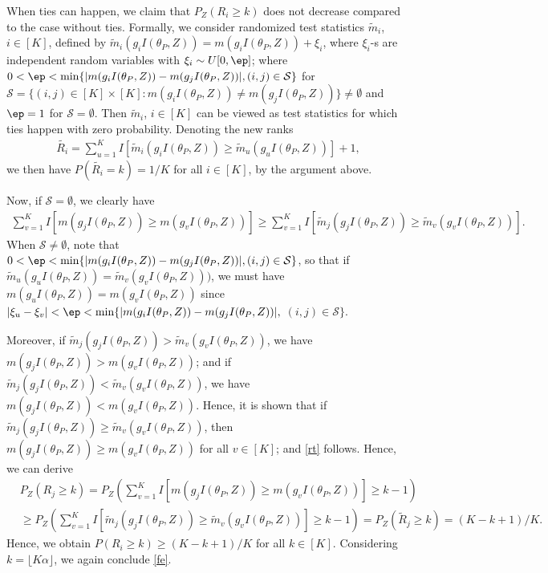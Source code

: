 \documentclass[english]{article}
\begin{document}
When ties can happen, we claim that $P_Z(R_i \ge k)$ does not decrease compared to the case without ties. Formally, we consider randomized test statistics $\tilde{m}_i$, $i\in[K]$, defined by $\tilde{m}_i(g_iI(\theta_P, Z)) = m(g_iI(\theta_P, Z)) + \xi_i$,
where $\xi_i$-s are independent random variables with $\xi_i \sim U[0,\ep]$; where $0 < \ep < \min\{|m(g_iI(\theta_P, Z))-m(g_jI(\theta_P, Z))|, (i,j) \in \mathcal{S}\}$ for $\mathcal{S} = \{(i,j) \in [K] \times [K]:m(g_iI(\theta_P, Z)) \neq m(g_jI(\theta_P, Z))\} \neq \emptyset$ and $\ep=1$ for $\mathcal{S} = \emptyset$. 
Then $\tilde{m}_i$, $i\in[K]$ can be viewed as test statistics for which ties happen with zero probability. 
Denoting the new ranks
 \begin{align*}\tilde{R_i}
    = \sum_{u=1}^K I
[ \tilde{m}_i(g_iI(\theta_P,Z)) \ge \tilde{m}_u(g_uI(\theta_P,Z)) ] + 1,
 \end{align*}
we then have $P(\tilde{R_i} = k) = 1/K$ for all $i \in [K]$, by the argument above. 

Now, if $\mathcal{S} = \emptyset$,
we clearly have
\begin{align}\label{rt}
  \sum_{v=1}^K I
[ m(g_jI(\theta_P,Z)) \ge m(g_vI(\theta_P,Z)) ] \ge  \sum_{v=1}^K I
[ \tilde{m}_j(g_jI(\theta_P,Z)) \ge \tilde{m}_v(g_vI(\theta_P,Z)) ]. 
\end{align}
When $\mathcal{S} \neq \emptyset$,
note that $0 < \ep < \min\{|m(g_iI(\theta_P, Z))-m(g_jI(\theta_P, Z))|, (i,j) \in \mathcal{S}\}$,
so that
if $\tilde{m}_u(g_uI(\theta_P,Z)) =\tilde{m}_v(g_vI(\theta_P,Z)))$, we must have $m(g_uI(\theta_P,Z)) = m(g_vI(\theta_P,Z))$ since $|\xi_u-\xi_v|<\ep < \min\{|m(g_iI(\theta_P, Z))-m(g_jI(\theta_P, Z))|,$ $(i,j) \in \mathcal{S}\}$.

Moreover, if $\tilde{m}_j(g_jI(\theta_P,Z)) > \tilde{m}_v(g_vI(\theta_P,Z))$, we have $m(g_jI(\theta_P,Z)) > m(g_vI(\theta_P,Z))$; and if  $\tilde{m}_j(g_jI(\theta_P,Z)) < \tilde{m}_v(g_vI(\theta_P,Z))$, we have $m(g_jI(\theta_P,Z)) < m(g_vI(\theta_P,Z))$. 
Hence, it is shown that
if $\tilde{m}_j(g_jI(\theta_P,Z)) \ge \tilde{m}_v(g_vI(\theta_P,Z))$, then $ m(g_jI(\theta_P,Z)) \ge m(g_vI(\theta_P,Z))$ for all $v \in [K]$; and \eqref{rt} follows.
Hence, we can derive
\begin{align*}
    &  P_Z(R_j \ge k)
    = P_Z\left(\sum_{v=1}^K I
[ m(g_jI(\theta_P,Z)) \ge m(g_vI(\theta_P,Z)) ] \ge k-1\right) \\
    &\ge P_Z\left(\sum_{v=1}^K I
[ \tilde{m}_j(g_jI(\theta_P,Z)) \ge \tilde{m}_v(g_vI(\theta_P,Z)) ] \ge k-1\right) 
= P_Z(\tilde{R}_j \ge k) = (K-k+1)/K.
\end{align*}
Hence, we obtain $P(R_i \ge k) \ge (K-k+1)/K$ for all $k \in [K]$. Considering $k=\lfloor K\alpha\rfloor$, we again conclude \eqref{fe}.
\end{document}

